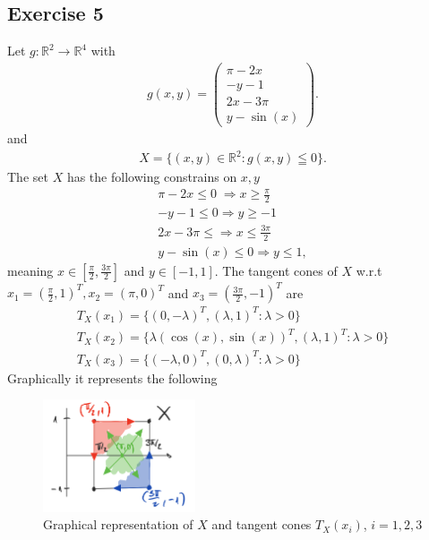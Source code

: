 \subsection{Exercise 5}
Let $g: \mathbb{R}^{2} \to \mathbb{R}^{4}$ with
\begin{align}
    g(x, y) =
    \begin{pmatrix}
        \pi - 2x\\
        -y - 1\\
        2x - 3\pi\\
        y - \sin(x)
    \end{pmatrix}.
\end{align}
and
\begin{align}
    X = \{(x,y) \in \mathbb{R}^{2}: g(x,y) \leqq 0\}.
\end{align}
The set $X$ has the following constrains on $x, y$
\begin{align}
    \pi - 2x \le 0 \; \Rightarrow x \ge \frac{\pi}{2}\\
    -y - 1 \le 0 \Rightarrow y \ge -1\\
    2x - 3\pi \le \Rightarrow x \le \frac{3\pi}{2}\\
    y - \sin\left( x \right) \le 0 \Rightarrow y \le 1,
\end{align}
meaning $x \in [\frac{\pi}{2}, \frac{3\pi}{2}]$ and $y \in [-1, 1]$.
The tangent cones of $X$ w.r.t $x_1 = (\frac{\pi}{2}, 1)^{T},
x_2=(\pi,0)^{T}$ and $x_3 = (\frac{3\pi}{2}, -1)^{T}$ are
\begin{align}
    T_X(x_1) = \{(0, -\lambda)^{T}, (\lambda, 1)^{T}: \lambda > 0\} \\
    T_X(x_2) = \{\lambda(\cos(x), \sin(x))^{T}, (\lambda, 1)^{T}: \lambda > 0\} \\
    T_X(x_3) = \{(-\lambda, 0)^{T}, (0, \lambda)^{T}: \lambda > 0\}
\end{align}
Graphically it represents the following
\begin{figure}[H]
    \centering
    \includegraphics[width=0.4\textwidth]{./build/pics/sesh1_ex5.png}
    \caption{Graphical representation of $X$ and tangent cones $T_X(x_i)$, $i=1, 2,
    3$}
    \label{fig:}
\end{figure}
